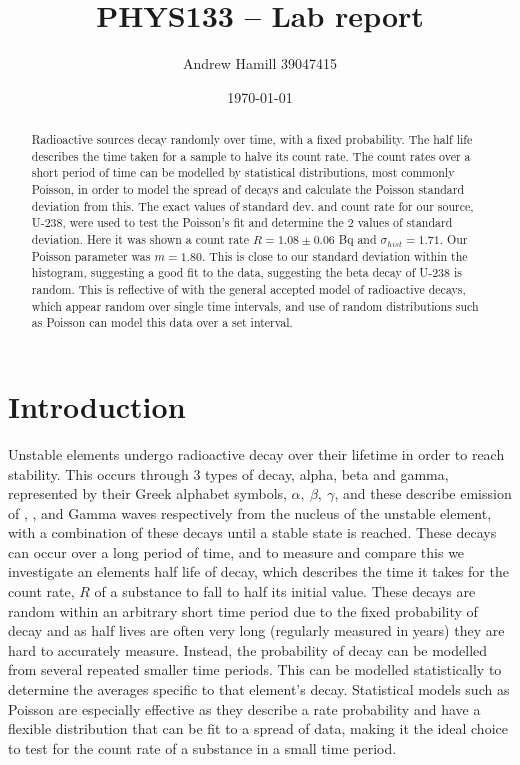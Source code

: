 \documentclass[11pt]{article}
\begin{document}
    \title{PHYS133 -- Lab report}
    \author{Andrew Hamill 39047415}
    \date{\today}
    \maketitle

    \begin{abstract}
    Radioactive sources decay randomly over time, with a fixed probability. The half life describes the time taken for a sample to halve its count rate. The count rates over a short period of time can be modelled by statistical distributions, most commonly Poisson, in order to model the spread of decays and calculate the Poisson standard deviation from this. The exact values of standard dev. and count rate for our source, U-238, were used to test the Poisson's fit and determine the 2 values of standard deviation. Here it was shown a count rate $ R = 1.08 \pm 0.06$ Bq and $\sigma_{hist} = 1.71$. Our Poisson parameter was $m = 1.80$. This is close to our standard deviation within the histogram, suggesting a good fit to the data, suggesting the beta decay of U-238 is random. This is reflective of with the general accepted model of radioactive decays, which appear random over single time intervals, and use of random distributions such as Poisson can model this data over a set interval. 
    \end{abstract}

    \section{Introduction}
    Unstable elements undergo radioactive decay over their lifetime in order to reach stability. This occurs through 3 types of decay, alpha, beta and gamma, represented by their Greek alphabet symbols, $\alpha,\  \beta,\ \gamma$, and these describe emission of , , and Gamma waves respectively from the nucleus of the unstable element, with a combination of these decays until a stable state is reached. These decays can occur over a long period of time, and to measure and compare this we investigate an elements half life of decay, which describes the time it takes for the count rate, $R$ of a substance to fall to half its initial value.
    These decays are random within an arbitrary short time period due to the fixed probability of decay and as half lives are often very long (regularly measured in years) they are hard to accurately measure. Instead, the probability of decay can be modelled from several repeated smaller time periods. This can be modelled statistically to determine the averages specific to that element's decay. Statistical models such as Poisson are especially effective as they describe a rate probability and have a flexible distribution that can be fit to a spread of data, making it the ideal choice to test for the count rate of a substance in a small time period. 
    
\end{document}
